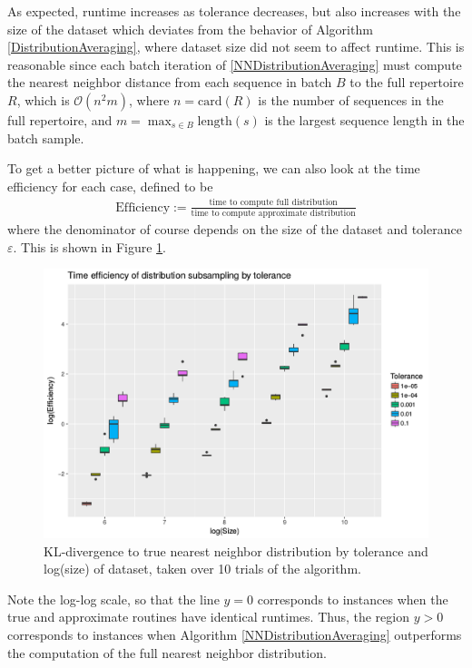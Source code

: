 \documentclass{article}
\begin{document}
As expected, runtime increases as tolerance decreases, but also increases with the size of the dataset which deviates from the behavior of Algorithm \ref{DistributionAveraging}, where dataset size did not seem to affect runtime.
This is reasonable since each batch iteration of \ref{NNDistributionAveraging} must compute the nearest neighbor distance from each sequence in batch $B$ to the full repertoire $R$, which is $\mathcal O(n^2 m)$, where $n = \text{card}(R)$ is the number of sequences in the full repertoire, and $m = \max_{s \in B} \text{length}(s)$ is the largest sequence length in the batch sample.

To get a better picture of what is happening, we can also look at the time efficiency for each case, defined to be 
\begin{align}
    \text{Efficiency} := \frac{\text{time to compute full distribution}}{\text{time to compute approximate distribution}}
\end{align}
where the denominator of course depends on the size of the dataset and tolerance $\varepsilon$.
This is shown in Figure \ref{fig:EfficiencyBySize}.
\begin{figure}
    \includegraphics[width=\linewidth]{Figures/NearestNeighbor/efficiency_by_size_and_tol_cdr3.png}
    \caption{KL-divergence to true nearest neighbor distribution by tolerance and log(size) of dataset, taken over 10 trials of the algorithm.}
    \label{fig:EfficiencyBySize}
\end{figure}
Note the log-log scale, so that the line $y=0$ corresponds to instances when the true and approximate routines have identical runtimes.
Thus, the region $y > 0$ corresponds to instances when Algorithm \ref{NNDistributionAveraging} outperforms the computation of the full nearest neighbor distribution.
\end{document}
